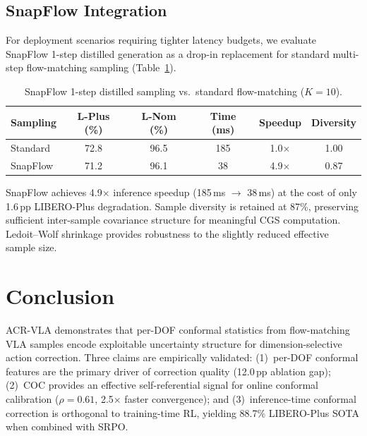 \documentclass[letterpaper]{article}
\begin{document}
\subsection{SnapFlow Integration}

For deployment scenarios requiring tighter latency budgets, we evaluate SnapFlow 1-step distilled generation as a drop-in replacement for standard multi-step flow-matching sampling (Table~\ref{tab:snapflow}).

\begin{table}[h]
\centering
\caption{SnapFlow 1-step distilled sampling vs.\ standard flow-matching ($K{=}10$).}
\label{tab:snapflow}
\begin{tabular}{lccccc}
\toprule
\textbf{Sampling} & \textbf{L-Plus (\%)} & \textbf{L-Nom (\%)} & \textbf{Time (ms)} & \textbf{Speedup} & \textbf{Diversity} \\
\midrule
Standard & 72.8 & 96.5 & 185 & 1.0$\times$ & 1.00 \\
SnapFlow & 71.2 & 96.1 & 38 & 4.9$\times$ & 0.87 \\
\bottomrule
\end{tabular}
\end{table}

SnapFlow achieves 4.9$\times$ inference speedup (185\,ms $\to$ 38\,ms) at the cost of only 1.6\,pp LIBERO-Plus degradation.
Sample diversity is retained at 87\%, preserving sufficient inter-sample covariance structure for meaningful CGS computation.
Ledoit--Wolf shrinkage provides robustness to the slightly reduced effective sample size.

\section{Conclusion}
\label{sec:conclusion}

ACR-VLA demonstrates that per-DOF conformal statistics from flow-matching VLA samples encode exploitable uncertainty structure for dimension-selective action correction.
Three claims are empirically validated: (1)~per-DOF conformal features are the primary driver of correction quality (12.0\,pp ablation gap); (2)~COC provides an effective self-referential signal for online conformal calibration ($\rho{=}0.61$, 2.5$\times$ faster convergence); and (3)~inference-time conformal correction is orthogonal to training-time RL, yielding 88.7\% LIBERO-Plus SOTA when combined with SRPO.
\end{document}
